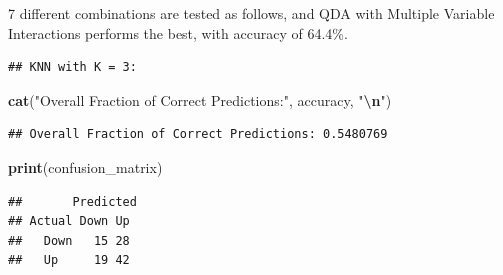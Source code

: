 \documentclass[
]{article}
\newenvironment{Shaded}{\begin{snugshade}}{\end{snugshade}}
\newcommand{\AttributeTok}[1]{\textcolor[rgb]{0.13,0.29,0.53}{#1}}
\newcommand{\CommentTok}[1]{\textcolor[rgb]{0.56,0.35,0.01}{\textit{#1}}}
\newcommand{\DecValTok}[1]{\textcolor[rgb]{0.00,0.00,0.81}{#1}}
\newcommand{\FunctionTok}[1]{\textcolor[rgb]{0.13,0.29,0.53}{\textbf{#1}}}
\newcommand{\NormalTok}[1]{#1}
\newcommand{\OtherTok}[1]{\textcolor[rgb]{0.56,0.35,0.01}{#1}}
\newcommand{\SpecialCharTok}[1]{\textcolor[rgb]{0.81,0.36,0.00}{\textbf{#1}}}
\newcommand{\StringTok}[1]{\textcolor[rgb]{0.31,0.60,0.02}{#1}}
\begin{document}
7 different combinations are tested as follows, and QDA with Multiple
Variable Interactions performs the best, with accuracy of 64.4\%.

\begin{Shaded}
\end{Shaded}

\begin{verbatim}
## KNN with K = 3:
\end{verbatim}

\begin{Shaded}
\begin{Highlighting}[]
\FunctionTok{cat}\NormalTok{(}\StringTok{"Overall Fraction of Correct Predictions:"}\NormalTok{, accuracy, }\StringTok{"}\SpecialCharTok{\textbackslash{}n}\StringTok{"}\NormalTok{)}
\end{Highlighting}
\end{Shaded}

\begin{verbatim}
## Overall Fraction of Correct Predictions: 0.5480769
\end{verbatim}

\begin{Shaded}
\begin{Highlighting}[]
\FunctionTok{print}\NormalTok{(confusion\_matrix)}
\end{Highlighting}
\end{Shaded}

\begin{verbatim}
##       Predicted
## Actual Down Up
##   Down   15 28
##   Up     19 42
\end{verbatim}
\end{document}
